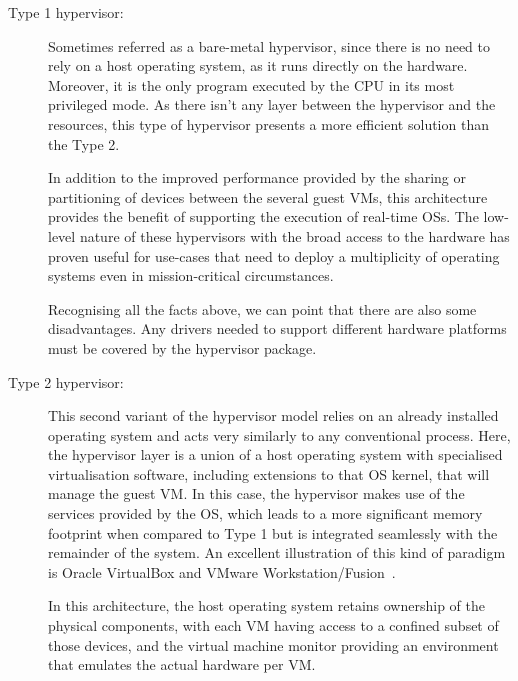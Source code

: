 \begin{description}
	\item [Type 1 hypervisor:] Sometimes referred as a bare-metal hypervisor, since there is no need to rely on a host operating system, as it runs directly on the hardware. Moreover, it is the only program executed by the CPU in its most privileged mode. As there isn't any layer between the hypervisor and the resources, this type of hypervisor presents a more efficient solution than the Type 2.

	In addition to the improved performance provided by the sharing or partitioning of devices between the several guest VMs, this architecture provides the benefit of supporting the execution of real-time OSs. The low-level nature of these hypervisors with the broad access to the hardware has proven useful for use-cases that need to deploy a multiplicity of operating systems even in mission-critical circumstances.
	
	Recognising all the facts above, we can point that there are also some disadvantages. Any drivers needed to support different hardware platforms must be covered by the hypervisor package. %
	
	\item [Type 2 hypervisor:] This second variant of the hypervisor model relies on an already installed operating system and acts very similarly to any conventional process. Here, the hypervisor layer is a union of a host operating system with specialised virtualisation software, including extensions to that OS kernel, that will manage the guest VM. In this case, the hypervisor makes use of the services provided by the OS, which leads to a more significant memory footprint when compared to Type 1 but is integrated seamlessly with the remainder of the system. An excellent illustration of this kind of paradigm is Oracle VirtualBox and VMware Workstation/Fusion~\cite{Agesen2010}.
	
	In this architecture, the host operating system retains ownership of the physical components, with each VM having access to a confined subset of those devices, and the virtual machine monitor providing an environment that emulates the actual hardware per VM. 
	

\end{description}
